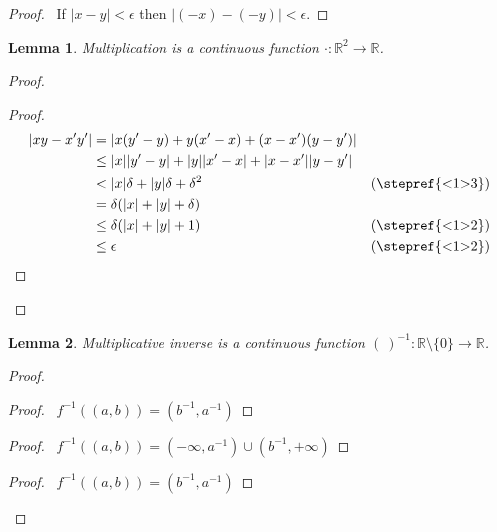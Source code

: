 \documentclass{report}
\let\qed\relax
\newtheorem{lm}{Lemma}[section]
\theoremstyle{definition}
\begin{document}
  \begin{proof}
    \pf\ If $|x - y| < \epsilon$ then $|(-x)-(-y)| < \epsilon$. \qed
  \end{proof}


  \begin{lm}
    Multiplication is a continuous function $\cdot : \mathbb{R}^2 \rightarrow
    \mathbb{R}$.
  \end{lm}

  \begin{proof}
    \pf
    \begin{proof}
      \pf
      \begin{align*}
        |xy - x'y'| & = |x (y' - y) + y (x' - x) + (x - x') (y - y')| \\
        & \leq |x| |y'- y| + |y| |x' - x| + |x - x'| |y - y'| \\
        & < |x| \delta + |y| \delta + \delta^2 & (\text{\stepref{<1>3}}) \\
        & = \delta (|x| + |y| + \delta) \\
        & \leq \delta (|x| + |y| + 1) & (\text{\stepref{<1>2}}) \\
        & \leq \epsilon & (\text{\stepref{<1>2}})
      \end{align*}
    \end{proof}
    \qed
  \end{proof}

  \begin{lm}
    Multiplicative inverse is a continuous function $(\ )^{-1} : \mathbb{R}
    \setminus \{ 0 \} \rightarrow \mathbb{R}$.
  \end{lm}

  \begin{proof}
    \pf
    \begin{proof}
      \pf\ $f^{-1}((a, b)) = (b^{-1}, a^{-1})$
    \end{proof}
    \begin{proof}
      \pf\ $f^{-1}((a, b)) = (-\infty, a^{-1}) \cup (b^{-1}, + \infty)$
    \end{proof}
    \begin{proof}
      \pf\ $f^{-1}((a, b)) = (b^{-1}, a^{-1})$
    \end{proof}
    \qed
  \end{proof}
\end{document}
